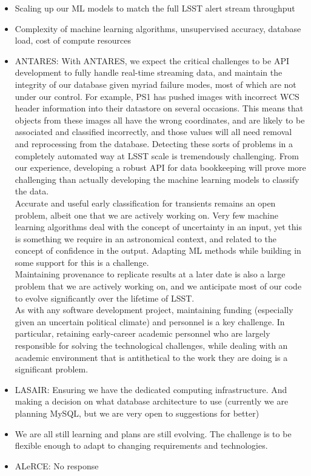 \documentclass{article}
\begin{document}
\begin{itemize}
\item Scaling up our ML models to match the full LSST alert stream throughput
\item Complexity of machine learning algorithms, unsupervised accuracy, database load, cost of compute resources
\item ANTARES: With ANTARES, we expect the critical challenges to be API development to fully handle real-time streaming data, and maintain the integrity of our database given myriad failure modes, most of which are not under our control. For example, PS1 has pushed images with incorrect WCS header information into their datastore on several occasions. This means that objects from these images all have the wrong coordinates, and are likely to be associated and classified incorrectly, and those values will all need removal and reprocessing from the database. Detecting these sorts of problems in a completely automated way at LSST scale is tremendously challenging. From our experience, developing a robust API for data bookkeeping will prove more challenging than actually developing the machine learning models to classify the data. \\
Accurate and useful early classification for transients remains an open problem, albeit one that we are actively working on. Very few machine learning algorithms deal with the concept of uncertainty in an input, yet this is something we require in an astronomical context, and related to the concept of confidence in the output. Adapting ML methods while building in some support for this is a challenge. \\
Maintaining provenance to replicate results at a later date is also a large problem that we are actively working on, and we anticipate most of our code to evolve significantly over the lifetime of LSST. \\
As with any software development project, maintaining funding (especially given an uncertain political climate) and personnel is a key challenge. In particular, retaining early-career academic personnel who are largely responsible for solving the technological challenges, while dealing with an academic environment that is antithetical to the work they are doing is a significant problem. 
\item LASAIR: Ensuring we have the dedicated computing infrastructure. And making a decision on what database architecture to use (currently we are planning MySQL, but we are very open to suggestions for better)  
\item We are all still learning and plans are still evolving. The challenge is to be flexible enough to adapt to changing requirements and technologies.
\item ALeRCE: No response
\end{itemize}
\end{document}
